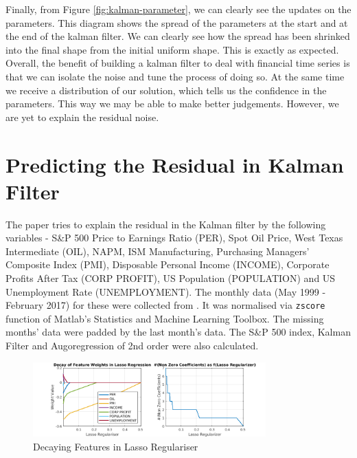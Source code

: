 \documentclass[11pt, fleqn]{article}
\begin{document}
Finally, from Figure \ref{fig:kalman-parameter}, we can clearly see the updates on the parameters. This diagram shows the spread of the parameters at the start and at the end of the kalman filter. We can clearly see how the spread has been shrinked into the final shape from the initial uniform shape. This is exactly as expected.\\

Overall, the benefit of building a kalman filter to deal with financial time series is that we can isolate the noise and tune the process of doing so. At the same time we receive a distribution of our solution, which tells us the confidence in the parameters. This way we may be able to make better judgements. However, we are yet to explain the residual noise.

\section{Predicting the Residual in Kalman Filter}

The paper tries to explain the residual in the Kalman filter by the following variables - S\&P 500 Price to Earnings Ratio (PER), Spot Oil Price, West Texas Intermediate (OIL), NAPM, ISM Manufacturing, Purchasing Managers' Composite Index (PMI), Disposable Personal Income (INCOME), Corporate Profits After Tax (CORP PROFIT), US Population (POPULATION) and US Unemployment Rate (UNEMPLOYMENT). The monthly data (May 1999 - February 2017) for these were collected from \cite{fed}. It was normalised via \texttt{zscore} function of Matlab's Statistics and Machine Learning Toolbox. The missing months' data were padded by the last month's data. The S\&P 500 index, Kalman Filter and Augoregression of 2nd order were also calculated. \\

\begin{figure}[!h]
    \centering
    \includegraphics[width=0.8\textwidth]{decay-lasso.png}
	\caption{Decaying Features in Lasso Regulariser}
	\label{fig:decay-lasso}
\end{figure}
\end{document}
